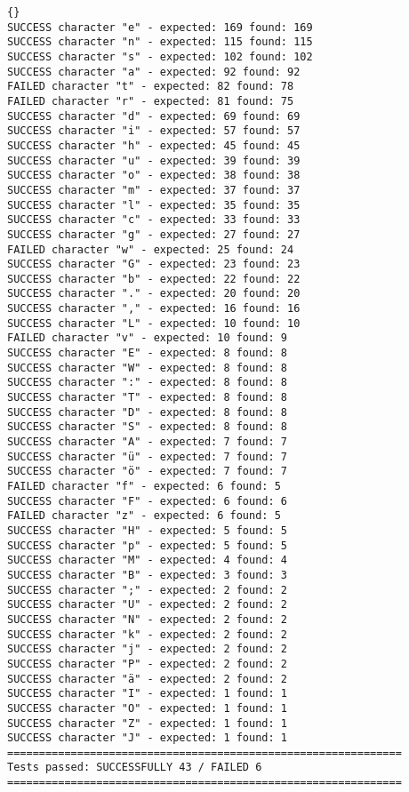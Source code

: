 \begin{lstlisting}{}
SUCCESS character "e" - expected: 169 found: 169
SUCCESS character "n" - expected: 115 found: 115
SUCCESS character "s" - expected: 102 found: 102
SUCCESS character "a" - expected: 92 found: 92
FAILED character "t" - expected: 82 found: 78
FAILED character "r" - expected: 81 found: 75
SUCCESS character "d" - expected: 69 found: 69
SUCCESS character "i" - expected: 57 found: 57
SUCCESS character "h" - expected: 45 found: 45
SUCCESS character "u" - expected: 39 found: 39
SUCCESS character "o" - expected: 38 found: 38
SUCCESS character "m" - expected: 37 found: 37
SUCCESS character "l" - expected: 35 found: 35
SUCCESS character "c" - expected: 33 found: 33
SUCCESS character "g" - expected: 27 found: 27
FAILED character "w" - expected: 25 found: 24
SUCCESS character "G" - expected: 23 found: 23
SUCCESS character "b" - expected: 22 found: 22
SUCCESS character "." - expected: 20 found: 20
SUCCESS character "," - expected: 16 found: 16
SUCCESS character "L" - expected: 10 found: 10
FAILED character "v" - expected: 10 found: 9
SUCCESS character "E" - expected: 8 found: 8
SUCCESS character "W" - expected: 8 found: 8
SUCCESS character ":" - expected: 8 found: 8
SUCCESS character "T" - expected: 8 found: 8
SUCCESS character "D" - expected: 8 found: 8
SUCCESS character "S" - expected: 8 found: 8
SUCCESS character "A" - expected: 7 found: 7
SUCCESS character "ü" - expected: 7 found: 7
SUCCESS character "ö" - expected: 7 found: 7
FAILED character "f" - expected: 6 found: 5
SUCCESS character "F" - expected: 6 found: 6
FAILED character "z" - expected: 6 found: 5
SUCCESS character "H" - expected: 5 found: 5
SUCCESS character "p" - expected: 5 found: 5
SUCCESS character "M" - expected: 4 found: 4
SUCCESS character "B" - expected: 3 found: 3
SUCCESS character ";" - expected: 2 found: 2
SUCCESS character "U" - expected: 2 found: 2
SUCCESS character "N" - expected: 2 found: 2
SUCCESS character "k" - expected: 2 found: 2
SUCCESS character "j" - expected: 2 found: 2
SUCCESS character "P" - expected: 2 found: 2
SUCCESS character "ä" - expected: 2 found: 2
SUCCESS character "I" - expected: 1 found: 1
SUCCESS character "O" - expected: 1 found: 1
SUCCESS character "Z" - expected: 1 found: 1
SUCCESS character "J" - expected: 1 found: 1
==============================================================
Tests passed: SUCCESSFULLY 43 / FAILED 6
==============================================================
\end{lstlisting}



